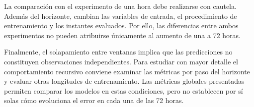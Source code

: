 La comparación con el experimento de una hora debe realizarse con cautela. Además del horizonte, cambian las variables de entrada, el procedimiento de entrenamiento y los instantes evaluados. Por ello, las diferencias entre ambos experimentos no pueden atribuirse únicamente al aumento de una a 72 horas.

Finalmente, el solapamiento entre ventanas implica que las predicciones no constituyen observaciones independientes. Para estudiar con mayor detalle el comportamiento recursivo conviene examinar las métricas por paso del horizonte y evaluar otras longitudes de entrenamiento. Las métricas globales presentadas permiten comparar los modelos en estas condiciones, pero no establecen por sí solas cómo evoluciona el error en cada una de las 72 horas.


